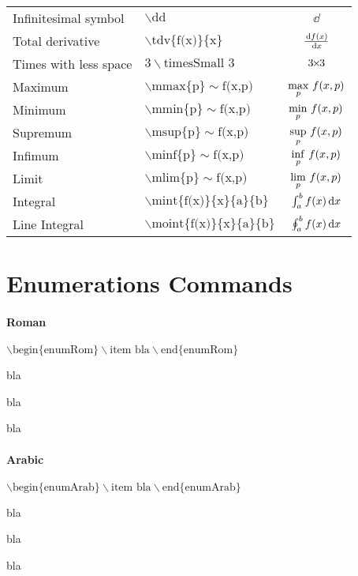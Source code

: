\documentclass[
  a4paper, 
  fontsize=12pt, 
  titlepage, 
  listof=totocnumbered, 
  index=totoc,        
  bibliography=totocnumbered, 
  numbers=noenddot
]{scrartcl}
\begin{document}
\begin{tabular}{l  l  c}
      Infinitesimal symbol & $\backslash \text{dd}$ & $\dd$ \\[3pt]
      Total derivative & $\backslash \text{tdv}\lbrace \text{f(x)} \rbrace\lbrace \text{x} \rbrace$ & $\tdv{f(x)}{x}$ \\[3pt]
      Times with less space & $3\backslash \text{timesSmall }3$ & $3\timesSmall 3$ \\[3pt]
      \midrule
      Maximum & $\backslash \text{mmax}\lbrace \text{p} \rbrace \sim\text{f(x,p)}$ & $\mmax{p}~f(x,p)$ \\[3pt]
      Minimum & $\backslash \text{mmin}\lbrace \text{p} \rbrace \sim\text{f(x,p)}$ & $\mmin{p}~f(x,p)$ \\[3pt]
      Supremum & $\backslash \text{msup}\lbrace \text{p} \rbrace \sim\text{f(x,p)}$ & $\msup{p}~f(x,p)$ \\[3pt]
      Infimum & $\backslash \text{minf}\lbrace \text{p} \rbrace \sim\text{f(x,p)}$ & $\minf{p}~f(x,p)$ \\[3pt]
      Limit & $\backslash \text{mlim}\lbrace \text{p} \rbrace \sim\text{f(x,p)}$ & $\mlim{p}~f(x,p)$ \\[3pt]
      Integral & $\backslash \text{mint}\lbrace\text{f(x)}\rbrace\lbrace\text{x}\rbrace\lbrace\text{a}\rbrace\lbrace\text{b}\rbrace$ & $\mint{f(x)}{x}{a}{b}$ \\[3pt]
      Line Integral & $\backslash \text{moint}\lbrace\text{f(x)}\rbrace\lbrace\text{x}\rbrace\lbrace\text{a}\rbrace\lbrace\text{b}\rbrace$ & $\moint{f(x)}{x}{a}{b}$ \\[3pt]
      \bottomrule
  \end{tabular}
  \newpage
  
\section{Enumerations Commands}
  \paragraph{Roman} 
    $\backslash \text{begin}\lbrace\text{enumRom}\rbrace \backslash \text{item bla}\backslash \text{end}\lbrace\text{enumRom}\rbrace$
    \begin{enumRom} 
      \item bla
      \item bla
      \item bla
    \end{enumRom}

  \paragraph{Arabic} 
  $\backslash \text{begin}\lbrace\text{enumArab}\rbrace \backslash \text{item bla}\backslash \text{end}\lbrace\text{enumArab}\rbrace$
    \begin{enumArab} 
      \item bla
      \item bla
      \item bla
    \end{enumArab}
\end{document}
